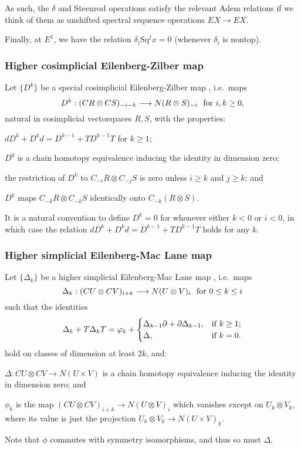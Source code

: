 \documentclass[10pt]{article}
\newcommand{\Sq}{\mathrm{Sq}}
\begin{document}
\begin{AdamsSSEQ operations final}
\begin{thm}
As such, the $\delta$ and Steenrod operations satisfy the relevant Adem relations if we think of them as unshifted spectral sequence operations $EX\to EX$.

Finally, at $E^1$, we have the relation $\delta_i\Sq^jx=0$ (whenever $\delta_i$ is nontop).
\end{thm}
\subsubsection*{Higher cosimplicial Eilenberg-Zilber map}
Let $\{D^k\}$ be a special cosimplicial Eilenberg-Zilber map \cite[5.2]{turner_opns_and_sseqs_I.pdf}, i.e.\  maps
\[D^k:(CR\otimes CS)_{-i-k}\to N(R\otimes S)_{-i}\textup{\ \ for $i,k\geq0$},\]
natural in cosimplicial vectorspaces $R,S$,
with the properties:
\begin{itemise}
\setlength{\parindent}{.25in}
\item $dD^k+D^kd=D^{k-1}+TD^{k-1}T$ for $k\geq1$;
\item $D^0$ is a chain homotopy equivalence inducing the identity in dimension zero;
\item the restriction of $D^k$ to $C_{-i}R\otimes C_{-j}S$ is zero unless $i\geq k$ and $j\geq k$; and
\item $D^k$ maps $C_{-k}R\otimes C_{-k}S$ identically onto $C_{-k}(R\otimes S)$.
\end{itemise}
It is a natural convention to define $D^k=0$ for whenever either $k<0$ or $i<0$, in which case the relation $dD^k+D^kd=D^{k-1}+TD^{k-1}T$ holds for any $k$.
\subsubsection*{Higher simplicial Eilenberg-Mac Lane map}
Let $\{\Delta_k\}$ be a higher simplicial Eilenberg-Mac Lane map \cite[\S3]{DwyerHtpyOpsSimpComAlg.pdf}, i.e.\ maps
\[\Delta_k:(CU\otimes CV)_{i+k}\to N(U\otimes V)_i\textup{\ \ for $0\leq k\leq i$}\]
such that the identities
\[\Delta_k+T\Delta_kT=\phi_k+\begin{cases}
\Delta_{k-1}\partial+\partial\Delta_{k-1},&\textup{if }k\geq1;\\
\Delta,&\textup{if }k=0.
\end{cases}
\]
hold on classes of dimension at least $2k$, and:
\begin{itemise}
\setlength{\parindent}{.25in}
\item $\Delta:CU\otimes CV\to N(U\times V)$ is a chain homotopy equivalence inducing the identity in dimension zero; and
\item $\phi_k$ is the map $(CU\otimes CV)_{i+k}\to N(U\otimes V)_i$ which vanishes except on $U_k\otimes V_k$, where its value is just the projection $U_k\otimes V_k\to N(U\times V)_k$.
\end{itemise}
Note that $\phi$ commutes with symmetry isomorphisms, and thus so must $\Delta$.


\end{AdamsSSEQ operations final}
\end{document}
